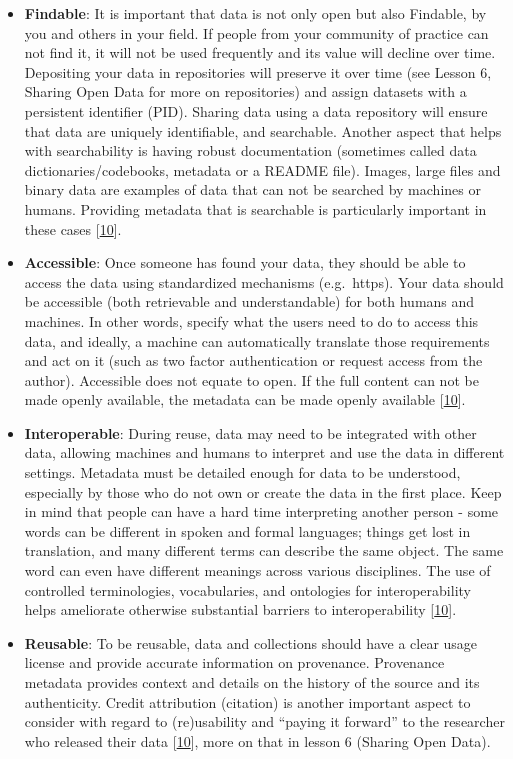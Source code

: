 \documentclass[
  letterpaper,
  DIV=11,
  numbers=noendperiod]{scrreport}
\begin{document}
\begin{itemize}
\item
  \textbf{Findable}: It is important that data is not only open but also
  Findable, by you and others in your field. If people from your
  community of practice can not find it, it will not be used frequently
  and its value will decline over time. Depositing your data in
  repositories will preserve it over time (see Lesson 6, Sharing Open
  Data for more on repositories) and assign datasets with a persistent
  identifier (PID). Sharing data using a data repository will ensure
  that data are uniquely identifiable, and searchable. Another aspect
  that helps with searchability is having robust documentation
  (sometimes called data dictionaries/codebooks, metadata or a README
  file). Images, large files and binary data are examples of data that
  can not be searched by machines or humans. Providing metadata that is
  searchable is particularly important in these cases
  {[}\href{https://doi.org/10.5281/zenodo.6532282}{10}{]}.
\item
  \textbf{Accessible}: Once someone has found your data, they should be
  able to access the data using standardized mechanisms (e.g.~https).
  Your data should be accessible (both retrievable and understandable)
  for both humans and machines. In other words, specify what the users
  need to do to access this data, and ideally, a machine can
  automatically translate those requirements and act on it (such as two
  factor authentication or request access from the author). Accessible
  does not equate to open. If the full content can not be made openly
  available, the metadata can be made openly available
  {[}\href{https://doi.org/10.5281/zenodo.6532282}{10}{]}.
\item
  \textbf{Interoperable}: During reuse, data may need to be integrated
  with other data, allowing machines and humans to interpret and use the
  data in different settings. Metadata must be detailed enough for data
  to be understood, especially by those who do not own or create the
  data in the first place. Keep in mind that people can have a hard time
  interpreting another person - some words can be different in spoken
  and formal languages; things get lost in translation, and many
  different terms can describe the same object. The same word can even
  have different meanings across various disciplines. The use of
  controlled terminologies, vocabularies, and ontologies for
  interoperability helps ameliorate otherwise substantial barriers to
  interoperability
  {[}\href{https://doi.org/10.5281/zenodo.6532282}{10}{]}.
\item
  \textbf{Reusable}: To be reusable, data and collections should have a
  clear usage license and provide accurate information on provenance.
  Provenance metadata provides context and details on the history of the
  source and its authenticity. Credit attribution (citation) is another
  important aspect to consider with regard to (re)usability and ``paying
  it forward'' to the researcher who released their data
  {[}\href{https://doi.org/10.5281/zenodo.6532282}{10}{]}, more on that
  in lesson 6 (Sharing Open Data).
\end{itemize}
\end{document}
